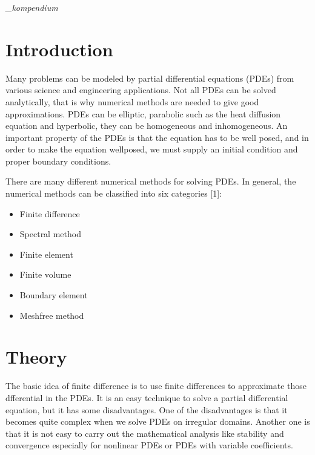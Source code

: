 \documentclass[a4paper,10pt,twoside]{article}
\begin{document}
\it_kompendium

%
%

\section{Introduction}
Many problems can be modeled by partial differential equations (PDEs) from various science and engineering applications. Not all PDEs can be solved analytically, that is why numerical methods are needed to give good approximations. PDEs can be elliptic, parabolic such as the heat diffusion equation and hyperbolic, they can be homogeneous and inhomogeneous. An important property of the PDEs is that the equation has to be well posed, and in order to make the equation wellposed, we must supply an initial condition and proper boundary conditions.

There are many different numerical methods for solving PDEs. In general, the numerical methods can be classified into six categories [1]:   
\begin{itemize}
    \item Finite difference
    \item Spectral method
    \item Finite element
    \item Finite volume
    \item Boundary element
    \item Meshfree method
\end{itemize}

\section{Theory}

The basic idea of finite difference is to use finite differences to approximate those dfferential in the PDEs. It is an easy technique to solve a partial differential equation, but it has some disadvantages. One of the disadvantages is that it becomes quite complex when we solve PDEs on irregular domains. Another one is that it is not easy to carry out the mathematical analysis like stability and convergence especially for nonlinear PDEs or PDEs with variable coefficients.
\end{document}
